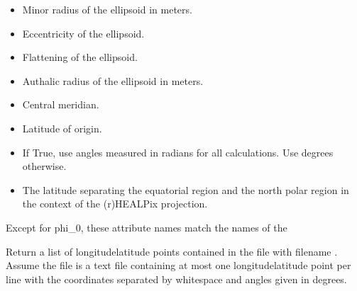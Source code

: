 \documentclass[a4paper,12ptopenany,oneside,english]{sphinxmanual}
\begin{document}
\begin{fulllineitems}
\begin{itemize}
\item {} 
\sphinxAtStartPar
{} \sphinxhyphen{} Minor radius of the ellipsoid in meters.

\item {} 
\sphinxAtStartPar
{} \sphinxhyphen{} Eccentricity of the ellipsoid.

\item {} 
\sphinxAtStartPar
{} \sphinxhyphen{} Flattening of the ellipsoid.

\item {} 
\sphinxAtStartPar
{} \sphinxhyphen{} Authalic radius of the ellipsoid in meters.

\item {} 
\sphinxAtStartPar
{} \sphinxhyphen{} Central meridian.

\item {} 
\sphinxAtStartPar
{} \sphinxhyphen{} Latitude of origin.

\item {} 
\sphinxAtStartPar
{} \sphinxhyphen{} If True, use angles measured in radians for all calculations.
Use degrees otherwise.

\item {} 
\sphinxAtStartPar
{} \sphinxhyphen{} The latitude separating the equatorial region and
the north polar region in the context of the (r)HEALPix projection.

\end{itemize}

\sphinxAtStartPar
Except for phi\_0, these attribute names match the names of the

\begin{fulllineitems}
\label{\detokenize{ellipsoids:rhealpixdggs.ellipsoids.Ellipsoid.get_points}}
\pysigstartsignatures
\pysiglinewithargsret
{}
{}
{}
\pysigstopsignatures
\sphinxAtStartPar
Return a list of longitude\sphinxhyphen{}latitude points contained in
the file with filename .
Assume the file is a text file containing at most one
longitude\sphinxhyphen{}latitude point per line with the coordinates separated by
whitespace and angles given in degrees.


\end{fulllineitems}
\end{fulllineitems}
\end{document}
